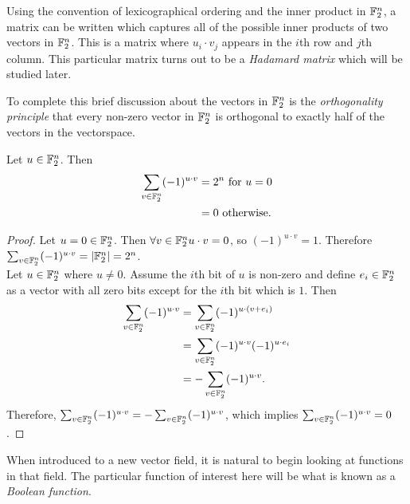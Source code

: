 \par Using the convention of lexicographical ordering and the inner product in $\mathbb{F}_2^n$, a
matrix can be written which captures all of the possible inner products of two vectors in
$\mathbb{F}_2^n$. This is a matrix where $u_i\cdot v_j$ appears in the $i$th row and $j$th column.
This particular matrix turns out to be a {\em Hadamard matrix} which will be studied later.

\par To complete this brief discussion about the vectors in $\mathbb{F}_2^n$ is the
{\em orthogonality principle} that every non-zero vector in $\mathbb{F}_2^n$ is orthogonal to
exactly half of the vectors in the vectorspace.

\begin{theorem}
	\label{thm:orthogonality-principle}
	Let $u\in\mathbb{F}_2^n$. Then
	\begin{align}
		\sum_{v\in\mathbb{F}_2^n}(-1)^{u\cdot v} &= 2^n {\rm \ for\ } u=0 \\
		                                   &= 0 {\rm \ otherwise.}
  \end{align}
\end{theorem}

\begin{proof}
	Let $u=0\in\mathbb{F}_2^n$. Then $\forall v\in\mathbb{F}_2^n u\cdot v=0$, so
	$(-1)^{u\cdot v}=1$. Therefore $\sum_{v\in\mathbb{F}_2^n}(-1)^{u\cdot v}=\lvert\mathbb{F}_2^n\rvert=2^n$. \\

	Let $u\in\mathbb{F}_2^n$ where $u\not=0$. Assume the $i$th bit of $u$ is non-zero and
	define $e_i\in\mathbb{F}_2^n$ as a vector with all zero bits except for the $i$th bit which is $1$. Then
	\begin{align*}
		\sum_{v\in\mathbb{F}_2^n}(-1)^{u\cdot v} &= \sum_{v\in\mathbb{F}_2^n}(-1)^{u\cdot (v+e_i)} \\
		                                   &= \sum_{v\in\mathbb{F}_2^n}(-1)^{u\cdot v}(-1)^{u\cdot e_i} \\
																			 &= -\sum_{v\in\mathbb{F}_2^n}(-1)^{u\cdot v}.
  \end{align*}
	Therefore, $\sum_{v\in\mathbb{F}_2^n}(-1)^{u\cdot v}=-\sum_{v\in\mathbb{F}_2^n}(-1)^{u\cdot v}$, which implies
	$\sum_{v\in\mathbb{F}_2^n}(-1)^{u\cdot v}=0$.
\end{proof}

\par When introduced to a new vector field, it is natural to begin looking at functions in
that field. The particular function of interest here will be what is known as a {\em Boolean function}.

